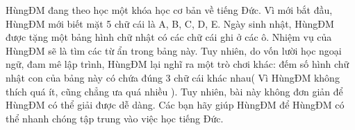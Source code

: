 HùngĐM đang theo học một khóa học cơ bản về tiếng Đức. Vì mới bắt đầu, HùngĐM mới biết mặt 5 chữ cái là A, B, C, D, E. Ngày sinh nhật, HùngĐM được tặng một bảng hình chữ nhật có các chữ cái ghi ở các ô. Nhiệm vụ của HùngĐM sẽ là tìm các từ ẩn trong bảng này. Tuy nhiên, do vốn lười học ngoại ngữ, đam mê lập trình, HùngĐM lại nghĩ ra một trò chơi khác: đếm số hình chữ nhật con của bảng này có chứa đúng 3 chữ cái khác nhau( Vì HùngĐM không thích quá ít, cũng chẳng ưa quá nhiều ). Tuy nhiên, bài này không đơn giản để HùngĐM có thể giải được dễ dàng. Các bạn hãy giúp HùngĐM để HùngĐM có thể nhanh chóng tập trung vào việc học tiếng Đức.